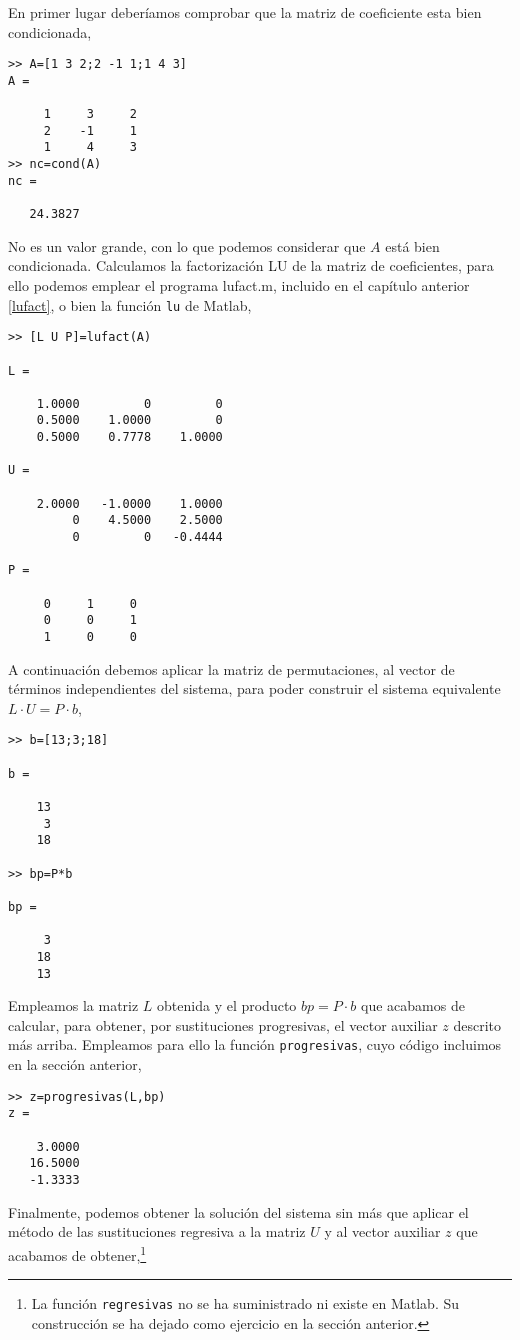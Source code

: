 En primer lugar deberíamos comprobar que la matriz de coeficiente esta bien condicionada,
\begin{verbatim}
>> A=[1 3 2;2 -1 1;1 4 3]
A =

     1     3     2
     2    -1     1
     1     4     3
>> nc=cond(A)
nc =

   24.3827
\end{verbatim}
No es un valor grande, con lo que podemos considerar que $A$ está bien condicionada. 
Calculamos la factorización LU de la matriz de coeficientes, para ello podemos emplear el programa lufact.m, incluido en el capítulo anterior \ref{lufact}, o bien la función \texttt{lu} de Matlab,

\begin{verbatim}
>> [L U P]=lufact(A)

L =

    1.0000         0         0
    0.5000    1.0000         0
    0.5000    0.7778    1.0000

U =

    2.0000   -1.0000    1.0000
         0    4.5000    2.5000
         0         0   -0.4444

P =

     0     1     0
     0     0     1
     1     0     0
\end{verbatim}

A continuación debemos aplicar la matriz de permutaciones, al vector de términos independientes del sistema, para poder construir el sistema equivalente $L\cdot U=P\cdot b$,
\begin{verbatim}
>> b=[13;3;18]

b =

    13
     3
    18

>> bp=P*b

bp =

     3
    18
    13

\end{verbatim}

Empleamos la matriz $L$ obtenida y el producto $bp=P\cdot b$ que acabamos de calcular, para obtener, por sustituciones progresivas, el vector auxiliar $z$ descrito más arriba. Empleamos para ello la función \texttt{progresivas}, cuyo código incluimos en la sección anterior, 
\begin{verbatim}
>> z=progresivas(L,bp)
z =

    3.0000
   16.5000
   -1.3333
\end{verbatim}

Finalmente, podemos obtener la solución del sistema sin más que aplicar el método de las sustituciones regresiva a la matriz $U$ y al vector auxiliar $z$ que acabamos de obtener,\footnote{La función \texttt{regresivas} no se ha suministrado ni existe en Matlab. Su construcción se ha dejado como ejercicio en la sección anterior.}

